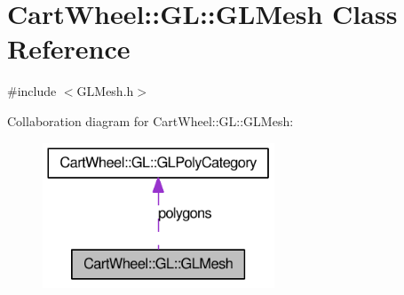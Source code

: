 \hypertarget{classCartWheel_1_1GL_1_1GLMesh}{
\section{CartWheel::GL::GLMesh Class Reference}
\label{classCartWheel_1_1GL_1_1GLMesh}
}


{\ttfamily \#include $<$GLMesh.h$>$}



Collaboration diagram for CartWheel::GL::GLMesh:\nopagebreak
\begin{figure}[H]
\begin{center}
\leavevmode
\includegraphics[width=196pt]{classCartWheel_1_1GL_1_1GLMesh__coll__graph}
\end{center}
\end{figure}
